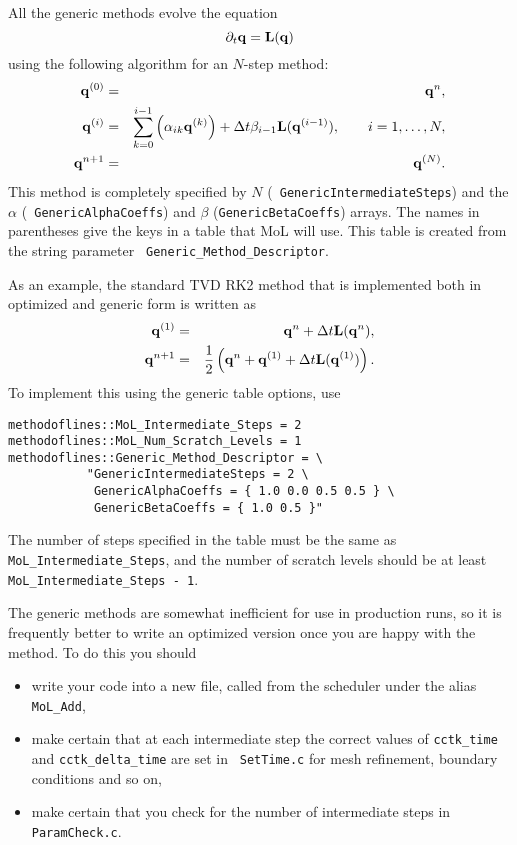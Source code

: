 All the generic methods evolve the equation
\begin{equation}
  \label{CactusBase_MoL_eq:mol3}
  \partial_t {\bf q} = {\bf L}({\bf q})
\end{equation}
using the following algorithm for an $N$-step method:
\begin{eqnarray}
  \label{CactusBase_MoL_eq:genrk1-scheme}
  {\bf q}^{(0)} & = & {\bf q}^n, \nonumber \\
  {\bf q}^{(i)} & = & \sum_{k=0}^{i-1} \left( \alpha_{ik} {\bf
  q}^{(k)} \right) + \Delta t \beta_{i-1} {\bf L} ( {\bf q}^{(i-1)} ),
  \qquad i = 1, \dots, N, \\
  {\bf q}^{n+1} & = & {\bf q}^{(N)}. \nonumber
\end{eqnarray}
This method is completely specified by $N$ ({\tt
  GenericIntermediateSteps}) and the $\alpha$ ({\tt
  GenericAlphaCoeffs}) and $\beta$ ({\tt GenericBetaCoeffs})
arrays. The names in parentheses give the keys in a table that MoL
will use. This table is created from the string parameter {\tt
  Generic\_Method\_Descriptor}. 

As an example, the standard TVD RK2 method that is implemented both in
optimized and generic form is written as
\begin{eqnarray}
  \label{CactusBase_MoL_eq:rk2-scheme}
  {\bf q}^{(1)} & = & {\bf q}^n + \Delta t {\bf L} ({\bf q}^n), \\
  {\bf q}^{n+1} & = & \frac{1}{2} \left( {\bf q}^n + {\bf q}^{(1)} +
  \Delta t {\bf L} ({\bf q}^{(1)}) \right). 
\end{eqnarray}
To implement this using the generic table options, use
\begin{verbatim}
methodoflines::MoL_Intermediate_Steps = 2
methodoflines::MoL_Num_Scratch_Levels = 1
methodoflines::Generic_Method_Descriptor = \
           "GenericIntermediateSteps = 2 \
            GenericAlphaCoeffs = { 1.0 0.0 0.5 0.5 } \
            GenericBetaCoeffs = { 1.0 0.5 }"
\end{verbatim}
The number of steps specified in the table must be the same as {\tt
  MoL\_Intermediate\_Steps}, and the number of scratch levels should
be at least {\tt MoL\_Intermediate\_Steps - 1}.

The generic methods are somewhat inefficient for use in production
runs, so it is frequently better to write an optimized version once
you are happy with the method. To do this you should
\begin{itemize}
\item write your code into a new file, called from the scheduler under
  the alias {\tt MoL\_Add},
\item make certain that at each intermediate step the correct values
  of {\tt cctk\_time} and {\tt cctk\_delta\_time} are set in {\tt
    SetTime.c} for mesh refinement, boundary conditions and so on,
\item make certain that you check for the number of intermediate steps
  in {\tt ParamCheck.c}.
\end{itemize}

